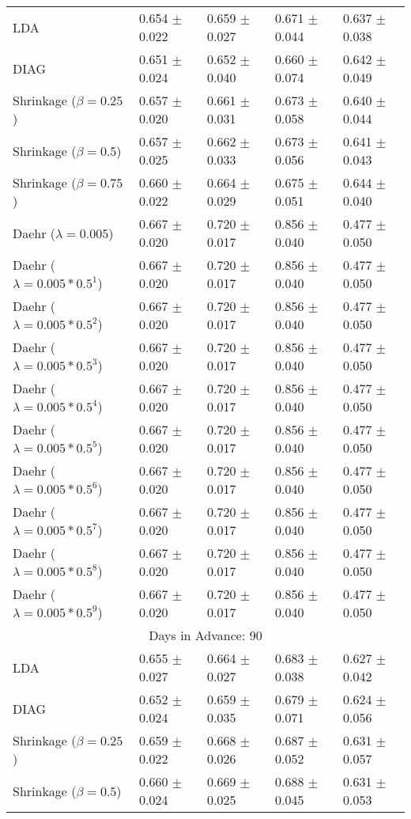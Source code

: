 \begin{table}
\begin{tabular}{*{5}{l}}
LDA&0.654 $\pm$ 0.022&0.659 $\pm$ 0.027&0.671 $\pm$ 0.044&0.637 $\pm$ 0.038\\
DIAG&0.651 $\pm$ 0.024&0.652 $\pm$ 0.040&0.660 $\pm$ 0.074&0.642 $\pm$ 0.049\\
Shrinkage ($\beta=0.25$)&0.657 $\pm$ 0.020&0.661 $\pm$ 0.031&0.673 $\pm$ 0.058&0.640 $\pm$ 0.044\\
Shrinkage ($\beta=0.5$)&0.657 $\pm$ 0.025&0.662 $\pm$ 0.033&0.673 $\pm$ 0.056&0.641 $\pm$ 0.043\\
Shrinkage ($\beta=0.75$)&0.660 $\pm$ 0.022&0.664 $\pm$ 0.029&0.675 $\pm$ 0.051&0.644 $\pm$ 0.040\\
Daehr ($\lambda=0.005$)&0.667 $\pm$ 0.020&0.720 $\pm$ 0.017&0.856 $\pm$ 0.040&0.477 $\pm$ 0.050\\
Daehr ($\lambda=0.005*0.5^1$)&0.667 $\pm$ 0.020&0.720 $\pm$ 0.017&0.856 $\pm$ 0.040&0.477 $\pm$ 0.050\\
Daehr ($\lambda=0.005*0.5^2$)&0.667 $\pm$ 0.020&0.720 $\pm$ 0.017&0.856 $\pm$ 0.040&0.477 $\pm$ 0.050\\
Daehr ($\lambda=0.005*0.5^3$)&0.667 $\pm$ 0.020&0.720 $\pm$ 0.017&0.856 $\pm$ 0.040&0.477 $\pm$ 0.050\\
Daehr ($\lambda=0.005*0.5^4$)&0.667 $\pm$ 0.020&0.720 $\pm$ 0.017&0.856 $\pm$ 0.040&0.477 $\pm$ 0.050\\
Daehr ($\lambda=0.005*0.5^5$)&0.667 $\pm$ 0.020&0.720 $\pm$ 0.017&0.856 $\pm$ 0.040&0.477 $\pm$ 0.050\\
Daehr ($\lambda=0.005*0.5^6$)&0.667 $\pm$ 0.020&0.720 $\pm$ 0.017&0.856 $\pm$ 0.040&0.477 $\pm$ 0.050\\
Daehr ($\lambda=0.005*0.5^7$)&0.667 $\pm$ 0.020&0.720 $\pm$ 0.017&0.856 $\pm$ 0.040&0.477 $\pm$ 0.050\\
Daehr ($\lambda=0.005*0.5^8$)&0.667 $\pm$ 0.020&0.720 $\pm$ 0.017&0.856 $\pm$ 0.040&0.477 $\pm$ 0.050\\
Daehr ($\lambda=0.005*0.5^9$)&0.667 $\pm$ 0.020&0.720 $\pm$ 0.017&0.856 $\pm$ 0.040&0.477 $\pm$ 0.050\\
\hline\multicolumn{5}{c}{  Days in Advance: 90}\\\hline
LDA&0.655 $\pm$ 0.027&0.664 $\pm$ 0.027&0.683 $\pm$ 0.038&0.627 $\pm$ 0.042\\
DIAG&0.652 $\pm$ 0.024&0.659 $\pm$ 0.035&0.679 $\pm$ 0.071&0.624 $\pm$ 0.056\\
Shrinkage ($\beta=0.25$)&0.659 $\pm$ 0.022&0.668 $\pm$ 0.026&0.687 $\pm$ 0.052&0.631 $\pm$ 0.057\\
Shrinkage ($\beta=0.5$)&0.660 $\pm$ 0.024&0.669 $\pm$ 0.025&0.688 $\pm$ 0.045&0.631 $\pm$ 0.053\\

\end{tabular}
\end{table}
